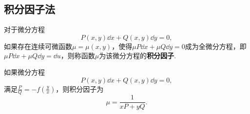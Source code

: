 \subsection{积分因子法}
对于微分方程\[
P(x,y)\dd{x} + Q(x,y)\dd{y} = 0,
\]如果存在连续可微函数\(\mu=\mu(x,y)\)，使得\(\mu P \dd{x} + \mu Q \dd{y} = 0\)成为全微分方程，即\(\mu P \dd{x} + \mu Q \dd{y} = \dd{u}\)，则称函数\(\mu\)为该微分方程的\textbf{积分因子}.

如果微分方程\[
P(x,y)\dd{x} + Q(x,y)\dd{y} = 0,
\]满足\(\frac{P}{Q}=-f\left(\frac{y}{x}\right)\)，则积分因子为\[
\mu = \frac{1}{xP+yQ}.
\]
